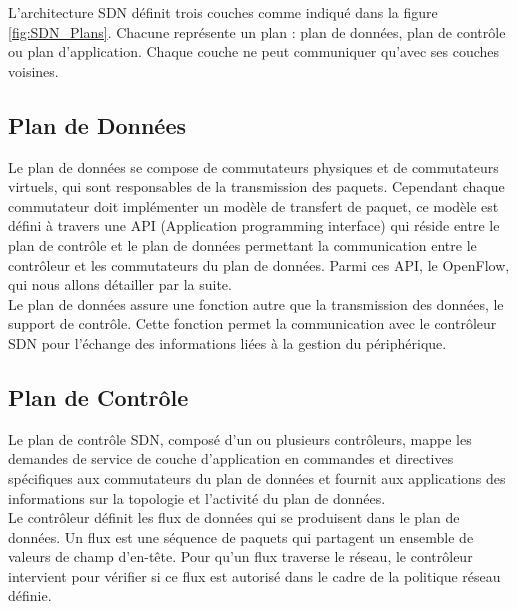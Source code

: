 L’architecture SDN définit trois couches comme indiqué dans la figure \ref{fig:SDN_Plans}. Chacune représente un plan : plan de données, plan de contrôle ou plan d’application. Chaque couche ne peut communiquer qu’avec ses couches voisines. 

\subsection{Plan de Données}
Le plan de données se compose de commutateurs physiques et de commutateurs virtuels, qui sont responsables de la transmission des paquets. Cependant chaque commutateur doit implémenter un modèle de transfert de paquet, ce modèle est défini à travers une API (Application programming interface) qui réside entre le plan de contrôle et le plan de données permettant la communication entre le contrôleur et les commutateurs du plan de données. Parmi ces API, le OpenFlow, qui nous allons détailler par la suite.\\

\noindent Le plan de données assure une fonction autre que la transmission des données, le support de contrôle. Cette fonction permet la communication avec le contrôleur SDN pour l’échange des informations liées à la gestion du périphérique.  

\subsection{Plan de Contrôle}
Le plan de contrôle SDN, composé d’un ou plusieurs contrôleurs, mappe les demandes de service de couche d’application en commandes et directives spécifiques aux commutateurs du plan de données et fournit aux applications des informations sur la topologie et l’activité du plan de données.\\

\noindent Le contrôleur définit les flux de données qui se produisent dans le plan de données. Un flux est une séquence de paquets qui partagent un ensemble de valeurs de champ d'en-tête. Pour qu’un flux traverse le réseau, le contrôleur intervient pour vérifier si ce flux est autorisé dans le cadre de la politique réseau définie.\\

